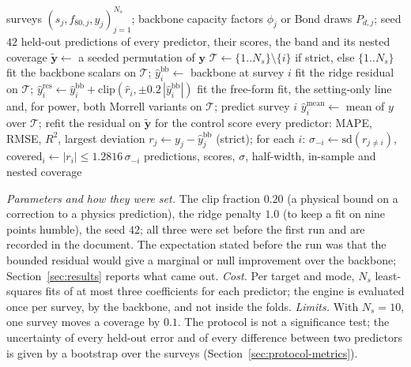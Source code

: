 \begin{algorithm}[!t]
\caption{CrusherCal: the strict and leaky leave-one-survey-out evaluation of one target, as \texttt{hp500/\allowbreak{}loo.py} runs it.}
\label{alg:crushercal}
\begin{algorithmic}[1]
\Require surveys $(s_j,f_{80,j},y_j)_{j=1}^{N_s}$; backbone capacity factors $\phi_j$ or Bond draws $P_{d,j}$; seed $42$
\Ensure held-out predictions of every predictor, their scores, the band and its nested coverage
\State $\tilde{\mathbf y}\gets$ a seeded permutation of $\mathbf y$ 
    \State $\mathcal T\gets\{1..N_s\}\setminus\{i\}$ if strict, else $\{1..N_s\}$
    \State fit the backbone scalars on $\mathcal T$; $\hat y^{\mathrm{bb}}_i\gets$ backbone at survey $i$
    \State fit the ridge residual on $\mathcal T$; $\hat y^{\mathrm{res}}_i\gets\hat y^{\mathrm{bb}}_i+\mathrm{clip}(\hat r_i,\pm0.2\,|\hat y^{\mathrm{bb}}_i|)$
    \State fit the free-form fit, the setting-only line and, for power, both Morrell variants on $\mathcal T$; predict survey $i$
    \State $\hat y^{\mathrm{mean}}_i\gets$ mean of $y$ over $\mathcal T$; refit the residual on $\tilde{\mathbf y}$ for the control
  \EndFor
  \State score every predictor: MAPE, RMSE, $R^2$, largest deviation
\EndFor
\State $r_j\gets y_j-\hat y^{\mathrm{bb}}_j$ (strict); for each $i$: $\sigma_{-i}\gets\mathrm{sd}(r_{j\ne i})$, covered$_i\gets|r_i|\le1.2816\,\sigma_{-i}$
\State \Return predictions, scores, $\sigma$, half-width, in-sample and nested coverage
\end{algorithmic}
\end{algorithm}

\emph{Parameters and how they were set.} The clip fraction $0.20$ (a physical bound on a correction to a physics prediction), the ridge penalty
$1.0$ (to keep a fit on nine points humble), the seed $42$; all three were set before the first run and are recorded in the document. The
expectation stated before the run was that the bounded residual would give a marginal or null improvement over the backbone; Section~\ref{sec:results}
reports what came out. \emph{Cost.} Per target and mode, $N_s$ least-squares fits of at most three coefficients for each predictor; the engine is
evaluated once per survey, by the backbone, and not inside the folds. \emph{Limits.} With $N_s=10$, one survey moves a coverage by $0.1$. The protocol is not a significance test; the uncertainty of every held-out
error and of every difference between two predictors is given by a bootstrap over the surveys (Section~\ref{sec:protocol-metrics}).

